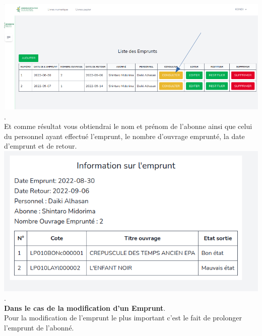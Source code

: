 \documentclass[12pt,a4paper]{article}
\begin{document}
\includegraphics[scale=0.5]{images/ConsultEmprunt.png}.\\

Et comme résultat vous obtiendrai le nom et prénom de l'abonne ainsi que celui du personnel ayant effectué l'emprunt, le nombre d'ouvrage emprunté, la date d'emprunt et de retour.\\

\includegraphics[scale=0.5]{images/ConsultationEmprunt.png}.\\

\newpage
\textbf{Dans le cas de la modification d'un Emprunt}.\\
Pour la modification de l'emprunt le plus important c'est le fait de prolonger l'emprunt de l'abonné.\\
\end{document}
